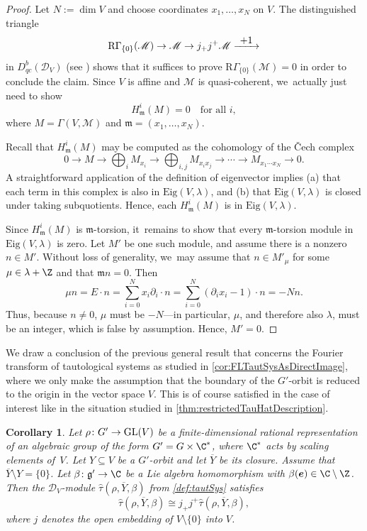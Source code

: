 \documentclass[JEP,XML,SOM,Unicode,published]{cedram}
\newcommand{\To}[1]{\mathchoice{\xrightarrow{\textstyle\kern4pt#1\kern3pt}}{\xrightarrow{\,#1\,}}{}{}}
\newcommand{\bme}{{\boldsymbol{e}}}
\newcommand{\Eig}{\mathrm{Eig}}
\newtheorem{cor}[thm]{Corollary}
\newcommand{\frg}{\mathfrak{g}}
\DeclareMathOperator{\GL}{\textup{GL}}
\begin{document}
\begin{proof}
Let $N := \dim V$ and choose coordinates $x_1,\dots,x_N$ on $V$. The distinguished triangle
\[
\mathrm{R}\Gamma_{\{0\}}(\mathscr{M}) \to \mathscr{M} \to j_+j^+\mathscr{M} \To{+1}
\]
in $D_{qc}^b(\mathscr D_V)$ (see \cite[Prop.\,1.7.1(i)]{Hotta}) shows that it suffices to prove $\mathrm{R}\Gamma_{\{0\}}(\mathscr{M}) = 0$ in order to conclude the claim. Since $V$ is affine and $\mathscr{M}$ is quasi-coherent, we~actually just need to show
\[
H^i_{\mathfrak{m}}(M)=0\quad\text{for all }i,
\]
where $M=\Gamma(V, \mathscr{M})$ and $\mathfrak{m}=(x_1,\ldots,x_N)$.

Recall that $H^i_\mathfrak{m}(M)$ may be computed as the cohomology of the \v{C}ech complex
\[
0 \to M \to \bigoplus_{i} M_{x_i} \to \bigoplus_{i,j} M_{x_ix_j} \to \cdots \to M_{x_1\cdots x_N}\to 0.
\]
A straightforward application of the definition of eigenvector implies (a) that each term in this complex is also in $\Eig(V,\lambda)$, and (b) that $\Eig(V,\lambda)$ is closed under taking subquotients. Hence, each $H^i_\mathfrak{m}(M)$ is in $\Eig(V,\lambda)$.

Since $H^i_\mathfrak{m}(M)$ is $\mathfrak{m}$-torsion, it~remains to show that every $\mathfrak{m}$-torsion module in $\Eig(V,\lambda)$ is zero. Let $M'$ be one such module, and assume there is a nonzero $n\in M'$. Without loss of generality, we~may assume that $n\in M'_\mu$ for some $\mu\in \lambda +\Z$ and that $\mathfrak{m}n=0$. Then
\[
\mu n = E\cdot n
= \sum_{i=0}^N x_i\partial_i \cdot n
= \sum_{i=0}^N (\partial_i x_i -1) \cdot n = -N n.
\]
Thus, because $n\neq 0$, $\mu$ must be $-N$---in particular, $\mu$, and therefore also $\lambda$, must be an integer, which is false by assumption. Hence, $M'=0$.
\end{proof}
We draw a conclusion of the previous general result that concerns the Fourier transform of tautological systems as studied in \cref{cor:FLTautSysAsDirectImage}, where we only make the assumption that the boundary of the $G'$-orbit is reduced to the origin in the vector space $V$. This is of course satisfied in the case of interest like in the situation studied in \cref{thm:restrictedTauHatDescription}.

\begin{cor} \label{cor:localization}
Let $\rho \colon G' \to \GL(V)$ be a finite-dimensional rational representation of an algebraic group of the form $G' = G \times \C^*$, where $\C^*$ acts by scaling elements of~$V$. Let $Y \subseteq V$ be a $G'$-orbit and let $\overline{Y}$ be its closure. Assume that $\overline{Y}\setminus Y = \{0\}$.
Let $\beta \colon \frg' \to \C$ be a Lie algebra homomorphism with $\beta(\bme) \in \C \setminus \Z$. Then the $\mathscr{D}_V$\nobreakdash-mod\-ule $\hat\tau(\rho,\overline{Y},\beta)$ from \cref{def:tautSys} satisfies
\[
\hat\tau(\rho,\overline{Y},\beta) \cong j_+ j^+\hat \tau(\rho,\overline{Y},\beta),
\]
where $j$ denotes the open embedding of $V \setminus \{0\}$ into $V$.
\end{cor}
\end{document}
